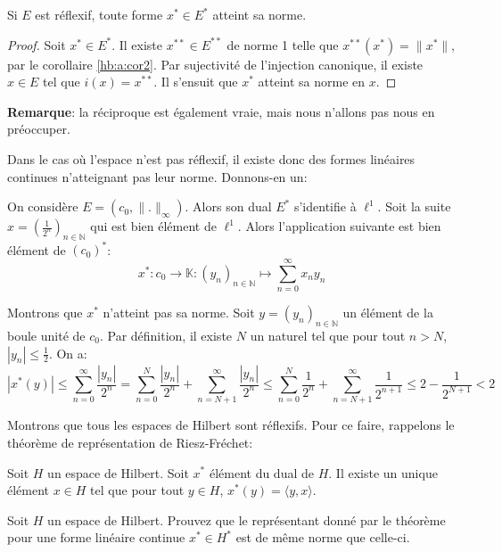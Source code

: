 \begin{prop}
  Si $E$ est réflexif, toute forme $x^*\in E^*$ atteint
  sa norme.
\end{prop}

\begin{proof}
  Soit $x^*\in E^*$. Il existe $x^{**}\in E^{**}$ de
  norme 1
  telle que $x^{**}(x^*)=\|x^*\|$, par le corollaire
  \ref{hb:a:cor2}. Par sujectivité de l'injection
  canonique, il existe $x\in E$ tel que $i(x)=x^{**}$.
  Il s'ensuit que $x^*$ atteint sa norme en $x$.
\end{proof}

\textbf{Remarque}: la réciproque est également vraie,
mais nous n'allons pas nous en préoccuper.

Dans le cas où l'espace n'est pas réflexif, il
existe donc des formes linéaires continues n'atteignant
pas leur norme. Donnons-en un:
\begin{ex}
  On considère $E = (c_0, \|.\|_\infty)$. Alors
  son dual $E^*$ s'identifie à $\ell^1$. Soit
  la suite $x = (\frac{1}{2^n})_{n\in \mathbb{N}}$
  qui est bien élément de $\ell^1$. Alors
  l'application suivante est bien élément de $(c_0)^*$:
  $$x^*:c_0\to\mathbb{K}:(y_n)_{n\in\mathbb{N}}\mapsto \sum_{n=0}^\infty x_ny_n$$

  Montrons que $x^*$ n'atteint pas sa norme. Soit $y = (y_n)_{n\in\mathbb{N}}$
  un élément de la boule unité de $c_0$. Par définition, il existe
  $N$ un naturel tel que pour tout $n > N$, $|y_n|\leq \frac{1}{2}$. On a:
  $$|x^*(y)| \leq \sum_{n=0}^\infty \frac{|y_n|}{2^n} =
  \sum_{n=0}^{N} \frac{|y_n|}{2^n} + \sum_{n=N+1}^\infty \frac{|y_n|}{2^n}
  \leq \sum_{n=0}^{N} \frac{1}{2^n} + \sum_{n=N+1}^\infty \frac{1}{2^{n+1}}
  \leq 2 - \frac{1}{2^{N+1}}<2$$
\end{ex}

Montrons que tous les espaces de Hilbert sont réflexifs.
Pour ce faire, rappelons le théorème de représentation
de Riesz-Fréchet:
\begin{thm}
  Soit $H$ un espace de Hilbert. Soit $x^*$ élément du dual de $H$.
  Il existe un unique élément $x\in H$ tel que pour tout $y\in H$,
  $x^*(y) = \langle y, x\rangle$.
\end{thm}

\begin{exo}
  Soit $H$ un espace de Hilbert.
  Prouvez que le représentant donné par le théorème
  pour une forme linéaire continue $x^*\in H^*$ est de même
  norme que celle-ci.
\end{exo}

